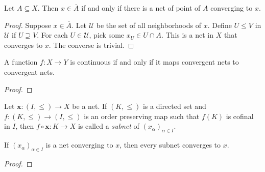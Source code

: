 \begin{theorem}
    Let $A\subseteq X$. Then $x\in\overline A$ if and only if there is a net of point of $A$ converging to $x$.
\end{theorem}
\begin{proof}
    Suppose $x\in\overline A$. Let $\mathscr U$ be the set of all neighborhoods of $x$. Define $U\le V$ in $\mathscr U$ if $U\supseteq V$. For each $U\in\mathscr U$, pick some $x_U\in U\cap A$. This is a net in $X$ that converges to $x$. The converse is trivial.
\end{proof}

\begin{theorem}
    A function $f: X\to Y$ is continuous if and only if it maps convergent nets to convergent nets.
\end{theorem}
\begin{proof}
    
\end{proof}

\begin{definition}
    Let $\mathbf x: (I,\le)\to X$ be a net. If $(K,\le)$ is a directed set and $f: (K,\le)\to(I,\le)$ is an order preserving map such that $f(K)$ is cofinal in $I$, then $f\circ\mathbf x: K\to X$ is called a \textit{subnet} of $(x_\alpha)_{\alpha\in I}$.
\end{definition}

\begin{proposition}
    If $(x_\alpha)_{\alpha\in I}$ is a net converging to $x$, then every subnet converges to $x$.
\end{proposition}
\begin{proof}
    
\end{proof}

